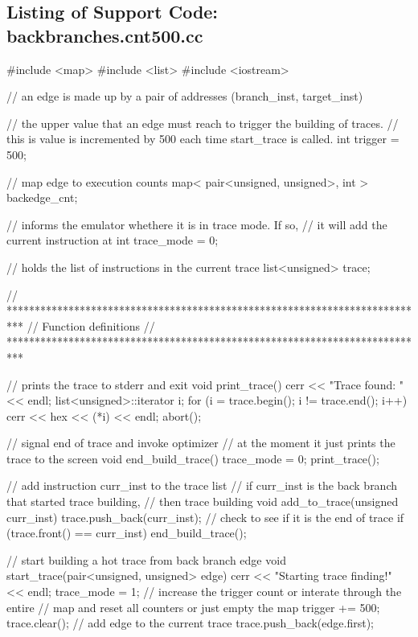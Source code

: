 \subsection{Listing of Support Code: backbranches.cnt500.cc}

\begin{smallverbatim}
#include <map>
#include <list>
#include <iostream>

// an edge is made up by a pair of addresses (branch_inst, target_inst)

// the upper value that an edge must reach to trigger the building of traces.
// this is value is incremented by 500 each time start_trace is called.
int trigger = 500;

// map edge to execution counts
map< pair<unsigned, unsigned>, int > backedge_cnt;

// informs the emulator whethere it is in trace mode.  If so, 
// it will add the current instruction at %
int trace_mode = 0;

// holds the list of instructions in the current trace
list<unsigned> trace;	


// ***************************************************************************
// Function definitions
// ***************************************************************************

// prints the trace to stderr and exit		
void print_trace() {
    cerr << "Trace found: " << endl;
    list<unsigned>::iterator i;
    for (i = trace.begin(); i != trace.end(); i++) {	
        cerr << hex << (*i) << endl;
    }
    abort();
}

// signal end of trace and invoke optimizer
// at the moment it just prints the trace to the screen
void end_build_trace() {
    trace_mode = 0;
    print_trace();
}
		
// add instruction curr_inst to the trace list
// if curr_inst is the back branch that started trace building, 
// then trace building
void add_to_trace(unsigned curr_inst) {
    trace.push_back(curr_inst);
    // check to see if it is the end of trace
    if (trace.front() == curr_inst) {
        end_build_trace();
    }
}

// start building a hot trace from back branch edge
void start_trace(pair<unsigned, unsigned> edge) {
    cerr << "Starting trace finding!" << endl;	
    trace_mode = 1;
    // increase the trigger count or interate through the entire 
    // map and reset all counters or just empty the map
    trigger += 500;
    trace.clear();
    // add edge to the current trace
    trace.push_back(edge.first);
}


\end{smallverbatim}
